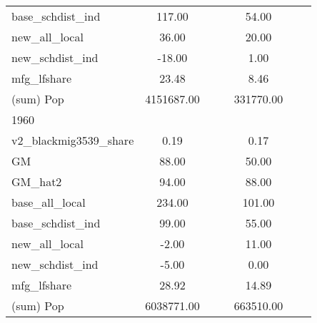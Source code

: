\begin{table}[htbp]
\begin{tabular}{l*{2}{ccc}}
base\_schdist\_ind    &      117.00&            &            &       54.00&            &            \\
new\_all\_local       &       36.00&            &            &       20.00&            &            \\
new\_schdist\_ind     &      -18.00&            &            &        1.00&            &            \\
mfg\_lfshare         &       23.48&            &            &        8.46&            &            \\
(sum) Pop           &  4151687.00&            &            &   331770.00&            &            \\
\midrule
1960                &            &            &            &            &            &            \\
v2\_blackmig3539\_share&        0.19&            &            &        0.17&            &            \\
GM                  &       88.00&            &            &       50.00&            &            \\
GM\_hat2             &       94.00&            &            &       88.00&            &            \\
base\_all\_local      &      234.00&            &            &      101.00&            &            \\
base\_schdist\_ind    &       99.00&            &            &       55.00&            &            \\
new\_all\_local       &       -2.00&            &            &       11.00&            &            \\
new\_schdist\_ind     &       -5.00&            &            &        0.00&            &            \\
mfg\_lfshare         &       28.92&            &            &       14.89&            &            \\
(sum) Pop           &  6038771.00&            &            &   663510.00&            &            \\
\bottomrule
\end{tabular}
\end{table}

